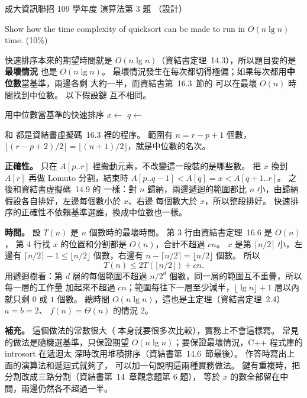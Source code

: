 \begin{pastexam}[label={px:ncku-109-prog-06}]{成大資訊聯招 109 學年度 演算法第 3 題}
（設計）

Show how the time complexity of quicksort can be made to run in $O(n\lg n)$ time. \quad (10\%)
\end{pastexam}

\begin{pastsoln}
快速排序本來的期望時間就是 $O(n \lg n)$（資結書定理~14.3），所以題目要的是\textbf{最壞情況}
也是 $O(n \lg n)$。 最壞情況發生在每次都切得極偏；如果每次都用\textbf{中位數}當基準，兩邊各剩
大約一半，而資結書第~16.3~節的  可以在最壞 $O(n)$ 時間找到中位數。 以下假設鍵
互不相同。

\begin{pseudo}{用中位數當基準的快速排序}
        \State $x \gets$  
        \State $q \gets$ 
        \State {}
        \State {}
    \EndIf
\EndProcedure
\end{pseudo}

 和  都是資結書虛擬碼~16.3 裡的程序。 範圍有
$n = r - p + 1$ 個數，$\lfloor (r - p + 2)/2 \rfloor = \lfloor (n+1)/2 \rfloor$，就是中位數的名次。

\textbf{正確性。}  只在 $A[p..r]$ 裡搬動元素，不改變這一段裝的是哪些數。
 把 $x$ 換到 $A[r]$ 再做 Lomuto 分割，結束時
$A[p..q-1] < A[q] = x < A[q+1..r]$。 之後和資結書虛擬碼~14.9 的 
一樣：對 $n$ 歸納，兩邊遞迴的範圍都比 $n$ 小，由歸納假設各自排好，左邊每個數小於 $x$、右邊
每個數大於 $x$，所以整段排好。 快速排序的正確性不依賴基準選誰，換成中位數也一樣。

\textbf{時間。} 設 $T(n)$ 是 $n$ 個數時的最壞時間。 第 3 行由資結書定理~16.6 是 $O(n)$，
第 4 行找 $x$ 的位置和分割都是 $O(n)$，合計不超過 $cn$。 $x$ 是第 $\lceil n/2 \rceil$ 小，左邊有
$\lceil n/2 \rceil - 1 \le \lfloor n/2 \rfloor$ 個數，右邊有 $n - \lceil n/2 \rceil = \lfloor n/2
\rfloor$ 個數。 所以
\[
T(n) \le 2T(\lfloor n/2 \rfloor) + cn .
\]
用遞迴樹看：第 $d$ 層的每個範圍不超過 $n/2^d$ 個數，同一層的範圍互不重疊，所以每一層的工作量
加起來不超過 $cn$；範圍每往下一層至少減半，$\lfloor \lg n \rfloor + 1$ 層以內就只剩 $0$ 或 $1$
個數。 總時間 $O(n \lg n)$，這也是主定理（資結書定理~2.4）$a = b = 2$、
$f(n) = \Theta(n)$ 的情況 2。

\textbf{補充。} 這個做法的常數很大（ 本身就要很多次比較），實務上不會這樣寫。 常見
的做法是隨機選基準，只保證期望 $O(n \lg n)$；要保證最壞情況，C++ 程式庫的 introsort 在遞迴太
深時改用堆積排序（資結書第~14.6~節最後）。 作答時寫出上面的演算法和遞迴式就夠了，
可以加一句說明這兩種實務做法。 鍵有重複時，把分割改成三路分割（資結書第~14~章觀念題第 6 題），
等於 $x$ 的數全部留在中間，兩邊仍然各不超過一半。
\end{pastsoln}
